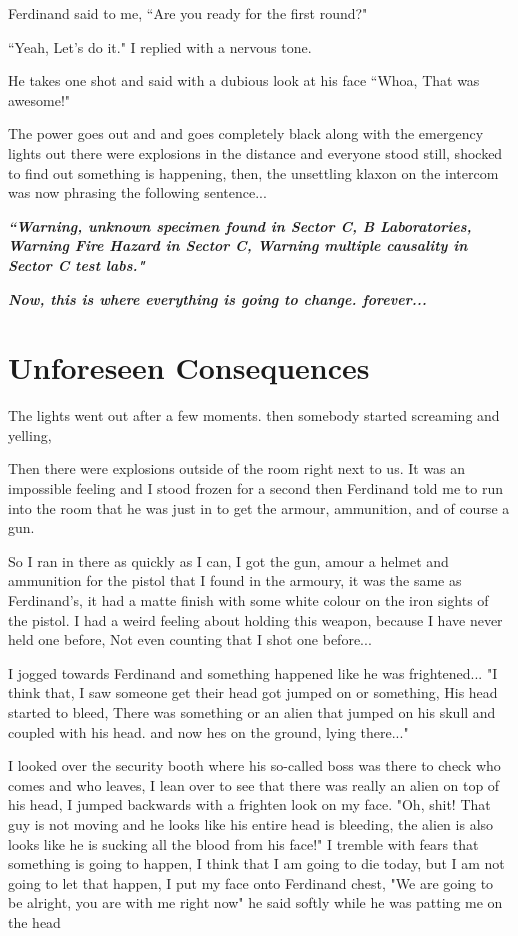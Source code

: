 \documentclass[14pt,letterpaper]{book}
\begin{document}
Ferdinand said to me, ``Are you ready for the first round?"

``Yeah, Let's do it." I replied with a nervous tone.

He takes one shot and said with a dubious look at his face ``Whoa, That was awesome!"

The power goes out and and goes completely black along with the emergency lights out there were explosions in the distance and everyone stood still, shocked to find out something is happening, then, the unsettling klaxon on the intercom was now phrasing the following sentence...

\large\textbf{\textit{``Warning, unknown specimen found in Sector C, B Laboratories, Warning Fire Hazard in Sector C, Warning multiple causality in Sector C test labs."}}

\par


\textbf{\emph{Now, this is where everything is going to change. forever...}}

\chapter{Unforeseen Consequences}
The lights went out after a few moments. then somebody started screaming and yelling, 

Then there were explosions outside of the room right next to us. It was an impossible feeling and I stood frozen for a second then Ferdinand told me to run into the room that he was just in to get the armour, ammunition, and of course a gun.

So I ran in there as quickly as I can, I got the gun, amour a helmet and ammunition for the pistol that I found in the armoury, it was the same as Ferdinand's, it had a matte finish with some white colour on the iron sights of the pistol. I had a weird feeling about holding this weapon, because I have never held one before, Not even counting that I shot one before...


I jogged towards Ferdinand and something happened like he was frightened... "I think that, I saw someone get their head got jumped on or something, His head started to bleed, There was something or an alien that jumped on his skull and coupled with his head. and now hes on the ground, lying there..."


I looked over the security booth where his so-called boss was there to check who comes and who leaves, I lean over to see that there was really an alien on top of his head, I jumped backwards with a frighten look on my face. "Oh, shit! That guy is not moving and he looks like his entire head is bleeding, the alien is also looks like he is sucking all the blood from his face!" I tremble with fears that something is going to happen, I think that I am going to die today, but I am not going to let that happen, I put my face onto Ferdinand chest, "We are going to be alright, you are with me right now" he said softly while he was patting me on the head
\end{document}
